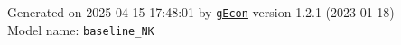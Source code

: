 \documentclass[10pt,a4paper]{article}
\numberwithin{equation}{section}
\begin{document}
\begin{landscape}
\begin{flushleft}{\large
Generated  on 2025-04-15 17:48:01 by \href{http://gecon.r-forge.r-project.org/}{\texttt{gEcon}} version 1.2.1 (2023-01-18)\\
Model name: \verb+baseline_NK+
}\end{flushleft}


\end{landscape}

\end{document}

